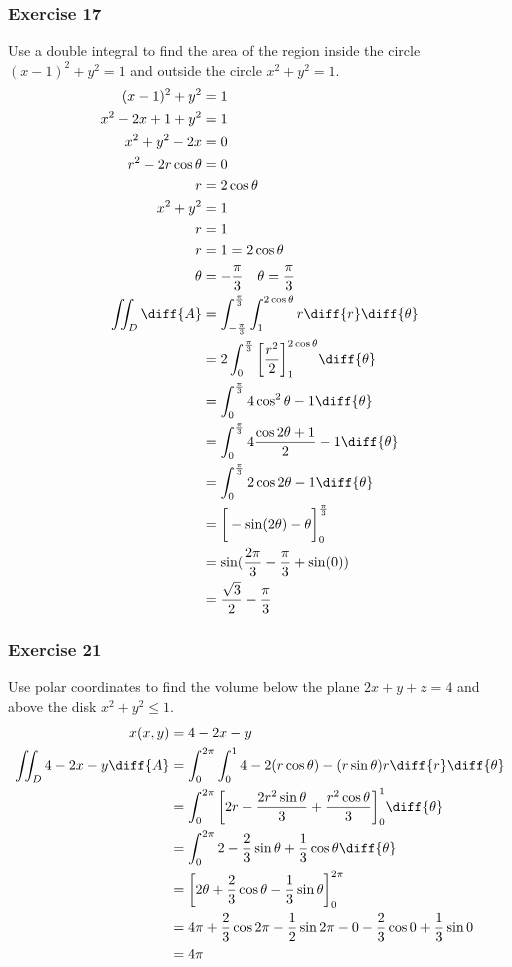 \documentclass{math}
\begin{document}
\subsubsection*{Exercise 17}
Use a double integral to find the area of the region inside the circle
\( (x-1)^2+y^2 = 1 \) and outside the circle \( x^2+y^2 = 1 \).
\begin{align*}
  (x-1)^2+y^2 &= 1 \\
  x^2-2x+1+y^2 &= 1 \\
  x^2+y^2-2x &= 0 \\
  r^2-2r\cos\theta &= 0 \\
  r &= 2\cos\theta \\
  x^2+y^2 &= 1 \\
  r &= 1 \\
  r &= 1 = 2\cos\theta \\
  \theta &= -\frac{\pi}{3} \quad \theta = \frac{\pi}{3} \\
  \iint_{D}\diff{A} &= \int_{-\frac{\pi}{3}}^{\frac{\pi}{3}}
    \int_{1}^{2\cos\theta}r\diff{r}\diff{\theta} \\
  &= 2\int_{0}^{\frac{\pi}{3}}
    \bigg[\frac{r^2}{2}\bigg]_{1}^{2\cos\theta}\diff{\theta} \\
  &= \int_{0}^{\frac{\pi}{3}}4\cos^2\theta-1\diff{\theta} \\
  &= \int_{0}^{\frac{\pi}{3}}4\frac{\cos2\theta+1}{2}-1\diff{\theta} \\
  &= \int_{0}^{\frac{\pi}{3}}2\cos2\theta-1\diff{\theta} \\
  &= \bigg[-\sin(2\theta)-\theta\bigg]_{0}^{\frac{\pi}{3}} \\
  &= \sin(\frac{2\pi}{3}-\frac{\pi}{3}+\sin(0)) \\
  &= \frac{\sqrt{3}}{2}-\frac{\pi}{3}
\end{align*}

\subsubsection*{Exercise 21}
Use polar coordinates to find the volume below the plane \( 2x+y+z = 4 \) and
above the disk \( x^2+y^2\le1 \).
\begin{align*}
  x(x,y) &= 4-2x-y \\
  \iint_{D}4-2x-y\diff{A} &= \int_{0}^{2\pi}\int_{0}^{1}
    4-2(r\cos\theta)-(r\sin\theta)r\diff{r}\diff{\theta} \\
  &= \int_{0}^{2\pi}\bigg[2r-\frac{2r^2\sin\theta}{3}+\frac{r^2\cos\theta}{3}
    \bigg]_{0}^{1}\diff{\theta} \\
  &= \int_{0}^{2\pi}
    2-\frac{2}{3}\sin\theta+\frac{1}{3}\cos\theta\diff{\theta} \\
  &= \bigg[
    2\theta+\frac{2}{3}\cos\theta-\frac{1}{3}\sin\theta\bigg]_{0}^{2\pi} \\
  &= 4\pi+\frac{2}{3}\cos2\pi-\frac{1}{2}\sin2\pi-
    0-\frac{2}{3}\cos0+\frac{1}{3}\sin0 \\
  &= 4\pi
\end{align*}
\end{document}
